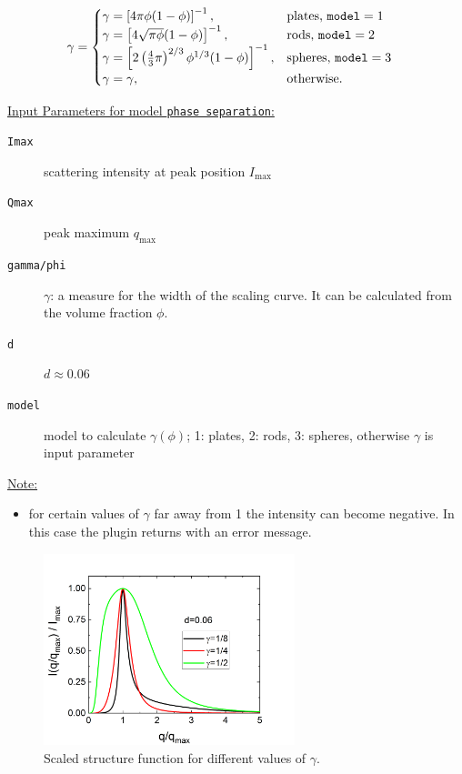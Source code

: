 \begin{align}\label{eq:gamma_phi}
  \gamma &=
  \begin{cases}
    \gamma=\left[4\pi\phi(1-\phi)\right]^{-1}, & \mbox{plates, \texttt{model}}=1 \\
    \gamma=\left[4\sqrt{\pi\phi}(1-\phi)\right]^{-1}, & \mbox{rods, \texttt{model}}=2 \\
    \gamma=\left[2\left(\frac43\pi\right)^{2/3}\phi^{1/3}(1-\phi)\right]^{-1}, & \mbox{spheres, \texttt{model}}=3 \\
    \gamma=\gamma, & \mbox{otherwise}.
  \end{cases}
\end{align}

\vspace{5mm}

\underline{Input Parameters for model \texttt{phase separation}:}\\
\begin{description}
\item[\texttt{Imax}] scattering intensity at peak position $I_\text{max}$
\item[\texttt{Qmax}] peak maximum $q_\text{max}$
\item[\texttt{gamma/phi}] $\gamma$: a measure for the width of the scaling curve. It can be calculated from the volume fraction $\phi$.
\item[\texttt{d}] $d \approx 0.06$
\item[\texttt{model}] model to calculate $\gamma(\phi)$; 1: plates, 2: rods, 3: spheres, otherwise $\gamma$ is input parameter
\end{description}

\underline{Note:}
\begin{itemize}
\item for certain values of $\gamma$ far away from 1 the intensity can become negative. In this case the plugin returns with an error message.
\end{itemize}



\begin{figure}[htb]
\begin{center}
\includegraphics[width=0.65\textwidth]{../images/form_factor/nonparticular/phase_separation.png}
\end{center}
\caption{Scaled structure function for different values of $\gamma$.} \label{fig:phaseseparationIQ}
\end{figure}

